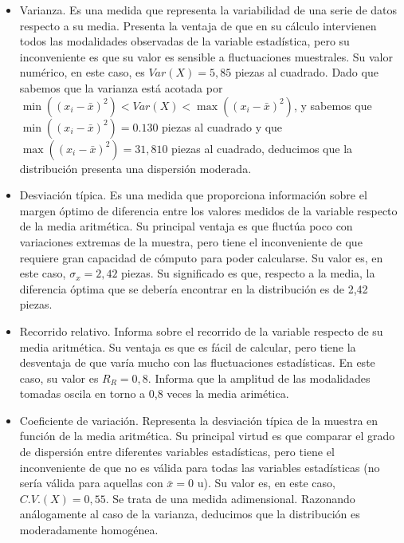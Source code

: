 \begin{itemize}
	\item Varianza. Es una medida que representa la variabilidad de una serie de datos respecto a su media. Presenta la ventaja de que en su cálculo intervienen todos las modalidades observadas de la variable estadística, pero su inconveniente es que su valor es sensible a fluctuaciones muestrales. Su valor numérico, en este caso, es $Var(X) = 5,85$ piezas al cuadrado. Dado que sabemos que la varianza está acotada por $\min((x_{i} - \bar x)^2) < Var(X) < \max((x_{i} - \bar x)^2)$, y sabemos que $\min((x_{i} - \bar x)^2) = 0.130$ piezas al cuadrado y que $\max((x_{i} - \bar x)^2) = 31,810$ piezas al cuadrado, deducimos que la distribución presenta una dispersión moderada.
	
	\item Desviación típica. Es una medida que proporciona información sobre el margen óptimo de diferencia entre los valores medidos de la variable respecto de la media aritmética. Su principal ventaja es que fluctúa poco con variaciones extremas de la muestra, pero tiene el inconveniente de que requiere gran capacidad de cómputo para poder calcularse. Su valor es, en este caso, $\sigma_{x} = 2,42$ piezas. Su significado es que, respecto a la media, la diferencia óptima que se debería encontrar en la distribución es de 2,42 piezas.
	
	\item Recorrido relativo. Informa sobre el recorrido de la variable respecto de su media aritmética. Su ventaja es que es fácil de calcular, pero tiene la desventaja de que varía mucho con las fluctuaciones estadísticas. En este caso, su valor es $R_{R} = 0,8$. Informa que la amplitud de las modalidades tomadas oscila en torno a 0,8 veces la media arimética.
	
	
	\item Coeficiente de variación. Representa la desviación típica de la muestra en función de la media aritmética. Su principal virtud es que comparar el grado de dispersión entre diferentes variables estadísticas, pero tiene el inconveniente de que no es válida para todas las variables estadísticas (no sería válida para aquellas con $\bar x = 0$ u). Su valor es, en este caso, $C.V.(X) = 0,55$. Se trata de una medida adimensional. Razonando análogamente al caso de la varianza, deducimos que la distribución es moderadamente homogénea.
	
\end{itemize}




